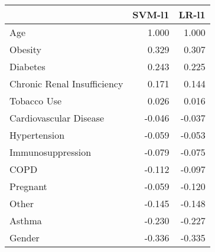 \begin{tabular}{lrr}
\toprule
{} &  SVM-l1 &  LR-l1 \\
\midrule
Age                         &   1.000 &  1.000 \\
Obesity                     &   0.329 &  0.307 \\
Diabetes                    &   0.243 &  0.225 \\
Chronic Renal Insufficiency &   0.171 &  0.144 \\
Tobacco Use                 &   0.026 &  0.016 \\
Cardiovascular Disease      &  -0.046 & -0.037 \\
Hypertension                &  -0.059 & -0.053 \\
Immunosuppression           &  -0.079 & -0.075 \\
COPD                        &  -0.112 & -0.097 \\
Pregnant                    &  -0.059 & -0.120 \\
Other                       &  -0.145 & -0.148 \\
Asthma                      &  -0.230 & -0.227 \\
Gender                      &  -0.336 & -0.335 \\
\bottomrule
\end{tabular}
